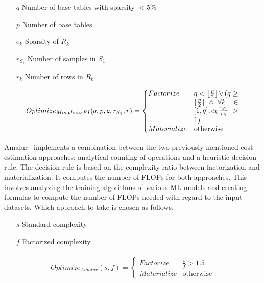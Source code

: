 \begin{definition}
  \begin{itemize}
    \item[]
    \item[$q$]Number of base tables with sparsity $ < 5\% $
    \item[$p$] Number of base tables
    \item[$e_k$] Sparsity of $R_k$
    \item[$r_{S_1}$] Number of samples in $S_1$
    \item[$r_k$] Number of rows in $R_k$
  \end{itemize}

  \begin{align*}
    \begin{split}
      Optimize_{MorpheusFI}(q, p, e, r_{S_1}, r) =
      \begin{cases}
        Factorize   & \parbox[t]{.18\linewidth}{$q < \lfloor \frac{p}{2} \rfloor \vee ( q \geq \lfloor \frac{p}{2} \rfloor \wedge \forall k \in [1,q], e_k \frac{r_{S_1}}{r_k} > 1)$} \\
        Materialize & \text{otherwise}
      \end{cases}
    \end{split}
  \end{align*}
\end{definition}

Amalur~\cite{amalur_tkde24} implements a combination between the two previously mentioned cost estimation approaches: analytical counting of operations and a heuristic decision rule. The decision rule is based on the complexity ratio between factorization and materialization. It computes the number of FLOPs for both approaches. This involves analyzing the training algorithms of various ML models and creating formulas to compute the number of FLOPs needed with regard to the input datasets. Which approach to take is chosen as follows.

\begin{definition}

  \begin{itemize}
    \item[]
    \item[$s$] Standard complexity
    \item[$f$] Factorized complexity
  \end{itemize}

  \begin{align*}
    \begin{split}
      Optimize_{Amalur}(s, f) =
      \begin{cases}
        Factorize   & \frac{s}{f} > 1.5 \\
        Materialize & \text{otherwise}
      \end{cases}
    \end{split}
  \end{align*}
\end{definition}

